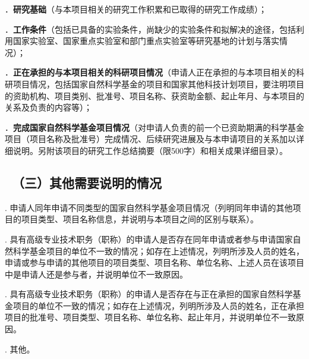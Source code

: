 \documentclass[12pt,UTF8,AutoFakeBold=3,a4paper]{ctexart} %
\newcommand{\sihao}{\fontsize{14pt}{\baselineskip}\selectfont}
\begin{document}
{\sihao \color{MsBlue} ．{\bfseries 研究基础}（与本项目相关的研究工作积累和已取得的研究工作成绩）；}

{}

{\sihao \color{MsBlue} ．{\bfseries 工作条件}（包括已具备的实验条件，尚缺少的实验条件和拟解决的途径，包括利用国家实验室、国家重点实验室和部门重点实验室等研究基地的计划与落实情况）；}

{}


{\sihao \color{MsBlue} ．{\bfseries 正在承担的与本项目相关的科研项目情况}（申请人正在承担的与本项目相关的科研项目情况，包括国家自然科学基金的项目和国家其他科技计划项目，要注明项目的资助机构、项目类别、批准号、项目名称、获资助金额、起止年月、与本项目的关系及负责的内容等）；}

{}

{\sihao \color{MsBlue} ．{\bfseries 完成国家自然科学基金项目情况}（对申请人负责的前一个已资助期满的科学基金项目（项目名称及批准号）完成情况、后续研究进展及与本申请项目的关系加以详细说明。另附该项目的研究工作总结摘要（限500字）和相关成果详细目录）。}

{}



{\color{MsBlue} \subsection{\sihao \templatefont \quad \ （三）其他需要说明的情况 }}

{\sihao \color{MsBlue} . 申请人同年申请不同类型的国家自然科学基金项目情况（列明同年申请的其他项目的项目类型、项目名称信息，并说明与本项目之间的区别与联系）。 }

{}

{\sihao \color{MsBlue} . 具有高级专业技术职务（职称）的申请人是否存在同年申请或者参与申请国家自然科学基金项目的单位不一致的情况；如存在上述情况，列明所涉及人员的姓名，申请或参与申请的其他项目的项目类型、项目名称、单位名称、上述人员在该项目中是申请人还是参与者，并说明单位不一致原因。}

{}

{\sihao \color{MsBlue} . 具有高级专业技术职务（职称）的申请人是否存在与正在承担的国家自然科学基金项目的单位不一致的情况；如存在上述情况，列明所涉及人员的姓名，正在承担项目的批准号、项目类型、项目名称、单位名称、起止年月，并说明单位不一致原因。}

{}

{\sihao \color{MsBlue} . 其他。}

{}

\clearpage
\end{document}
